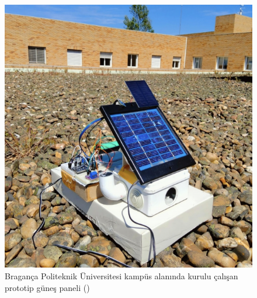\begin{figure}[htbp]
\centerline{\includegraphics[width= 6 cm]{Resim/Screenshot 2022-09-29 at 16.05.17.png}}
\caption{Bragança Politeknik Üniversitesi kampüs alanında kurulu çalışan prototip güneş paneli (\protect{}) }
\label{fig:delly}
\end{figure}



